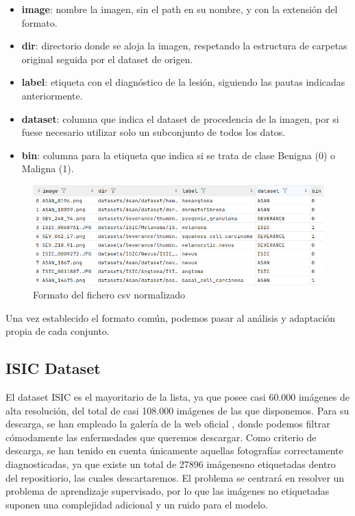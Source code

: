 \begin{itemize}
	\item \textbf{image}: nombre la imagen, sin el path en su nombre, y con la extensión del formato.
	\item \textbf{dir}: directorio donde se aloja la imagen, respetando la estructura de carpetas original seguida por el dataset de origen.
	\item \textbf{label}: etiqueta con el diagnóstico de la lesión, siguiendo las pautas indicadas anteriormente.
	\item \textbf{dataset}: columna que indica el dataset de procedencia de la imagen, por si fuese necesario utilizar solo un subconjunto de todos los datos.
	\item \textbf{bin}: columna para la etiqueta que indica si se trata de clase Benigna (0) o Maligna (1).
\end{itemize}

\begin{figure}[H]
	\centering
	\includegraphics[scale = 0.45]{imagenes/formatocsv.png}
	\caption{Formato del fichero csv normalizado}
	\label {formatocsv}
\end{figure}

Una vez establecido el formato común, podemos pasar al análisis y adaptación propia de cada conjunto.

\subsection{ISIC Dataset}

El dataset ISIC es el mayoritario de la lista, ya que posee casi 60.000 imágenes de alta resolución, del total de casi 108.000 imágenes de las que disponemos. Para su descarga, se han empleado la galería de la web oficial \cite{isicarchive}, donde podemos filtrar cómodamente las enfermedades que queremos descargar. Como criterio de descarga, se han tenido en cuenta únicamente aquellas fotografías correctamente diagnosticadas, ya que existe un total de 27896 imágenesno etiquetadas dentro del repositiorio, las cuales descartaremos. El problema se centrará en resolver un problema de aprendizaje supervisado, por lo que las imágenes no etiquetadas suponen una complejidad adicional y un ruido para el modelo.

